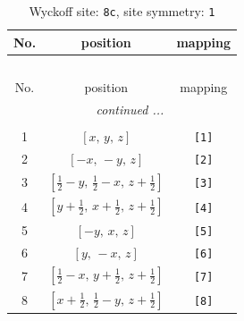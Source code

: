 \documentclass[fleqn,8pt]{jsarticle}
\begin{document}
\renewcommand{\arraystretch}{1.2}
\begin{longtable}{ccc}
\caption{Wyckoff site: {\tt 8c}, site symmetry: {\tt 1}}
 \\
 \hline \hline
No. & position & mapping \\ \hline \endfirsthead

\multicolumn{2}{l}{\tablename\ \thetable{}} \\
 \hline \hline
No. & position & mapping \\ \hline \endhead

 \hline \hline
\multicolumn{2}{r}{\footnotesize\it continued ...} \\ \endfoot

 \hline \hline
\multicolumn{2}{r}{} \\ \endlastfoot

1 & $\left[ x,\, y,\, z \right]$ & {\tt [1]} \\ \hline
2 & $\left[ - x,\, - y,\, z \right]$ & {\tt [2]} \\ \hline
3 & $\left[ \frac{1}{2} - y,\, \frac{1}{2} - x,\, z + \frac{1}{2} \right]$ & {\tt [3]} \\ \hline
4 & $\left[ y + \frac{1}{2},\, x + \frac{1}{2},\, z + \frac{1}{2} \right]$ & {\tt [4]} \\ \hline
5 & $\left[ - y,\, x,\, z \right]$ & {\tt [5]} \\ \hline
6 & $\left[ y,\, - x,\, z \right]$ & {\tt [6]} \\ \hline
7 & $\left[ \frac{1}{2} - x,\, y + \frac{1}{2},\, z + \frac{1}{2} \right]$ & {\tt [7]} \\ \hline
8 & $\left[ x + \frac{1}{2},\, \frac{1}{2} - y,\, z + \frac{1}{2} \right]$ & {\tt [8]} \\
\end{longtable}
\end{document}
